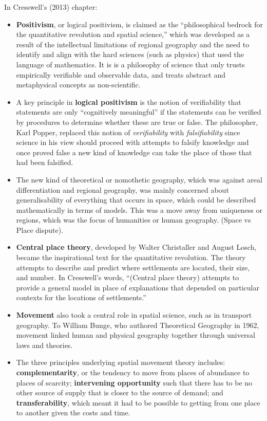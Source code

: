 \documentclass[a4paper, 10.5pt]{article} %
\begin{document}
\vspace{10pt}

In Cresswell's (2013) chapter:

\begin{itemize}
	\item \textbf{Positivism}, or logical positivism, is claimed as the \enquote{philosophical bedrock for the quantitative revolution and spatial science,} which was developed as a result of the intellectual limitations of regional geography and the need to identify and align with the hard sciences (such as physics) that used the language of mathematics. It is is a philosophy of science that only trusts empirically verifiable and observable data, and treats abstract and metaphysical concepts as non-scientific.
	\item A key principle in \textbf{logical positivism} is the notion of verifiability that statements are only \enquote{cognitively meaningful} if the statements can be verified by procedures to determine whether these are true or false. The philosopher, Karl Popper, replaced this notion of \textit{verifiability} with \textit{falsifiability} since science in his view should proceed with attempts to falsify knowledge and once proved false a new kind of knowledge can take the place of those that had been falsified.
	\item The new kind of theoretical or nomothetic geography, which was against areal differentiation and regional geography, was mainly concerned about generalisability of everything that occurs in space, which could be described mathematically in terms of models. This was a move away from uniqueness or regions, which was the focus of humanities or human geography. (Space vs Place dispute).
	\item \textbf{Central place theory}, developed by Walter Christaller and August Losch, became the inspirational text for the quantitative revolution. The theory attempts to describe and predict where settlements are located, their size, and number. In Cresswell's words, \enquote{(Central place theory) attempts to provide a general model in place of explanations that depended on particular contexts for the locations of settlements.}
	\item \textbf{Movement} also took a central role in spatial science, such as in transport geography. To William Bunge, who authored Theoretical Geography in 1962, movement linked human and physical geography together through universal laws and theories.
	\item The three principles underlying spatial movement theory includes: \textbf{complementarity}, or the tendency to move from places of abundance to places of scarcity; \textbf{intervening opportunity} such that there has to be no other source of supply that is closer to the source of demand; and \textbf{transferability}, which meant it had to be possible to getting from one place to another given the costs and time.

\end{itemize}
\end{document}
